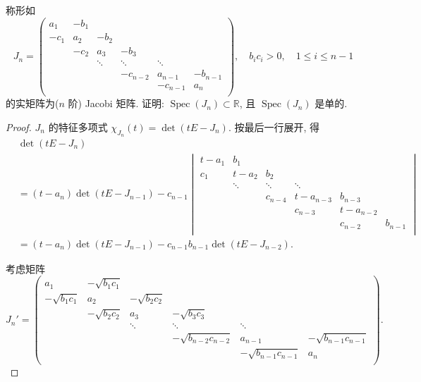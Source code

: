 \documentclass[color=black,device=normal,lang=cn,mode=geye]{elegantnote}
\begin{document}
\begin{exercise}%
    称形如
    \[J_n=\begin{pmatrix}
        a_1 & -b_1 \\
        -c_1 & a_2 & -b_2 \\
        & -c_2 & a_3 & -b_3 \\
        && \ddots & \ddots & \ddots \\
        &&& -c_{n-2} & a_{n-1} & -b_{n-1} \\
        &&&& -c_{n-1} & a_n \\
    \end{pmatrix},\quad b_ic_i>0,\quad1\leq i\leq n-1\]
    的实矩阵为($n$ 阶) Jacobi 矩阵. 证明: $\operatorname{Spec}(J_n)\subset\mathbb{R}$, 且 $\operatorname{Spec}(J_n)$ 是单的.
\end{exercise}
\begin{proof}
    $J_n$ 的特征多项式 $\chi_{J_n}(t)=\det(tE-J_n)$. 按最后一行展开, 得
    \begin{align*}
        & \det(tE-J_n) \\
        & =(t-a_n)\det(tE-J_{n-1})-c_{n-1}\begin{vmatrix}
            t-a_1 & b_1 \\
            c_1 & t-a_2 & b_2 \\
            & \ddots & \ddots & \ddots \\
            && c_{n-4} & t-a_{n-3} & b_{n-3} \\
            &&& c_{n-3} & t-a_{n-2} \\
            &&&& c_{n-2} & b_{n-1} \\
        \end{vmatrix} \\
        & =(t-a_n)\det(tE-J_{n-1})-c_{n-1}b_{n-1}\det(tE-J_{n-2}).
    \end{align*}

    考虑矩阵
    \[J_n'=\begin{pmatrix}
        a_1 & -\sqrt{b_1c_1} \\
        -\sqrt{b_1c_1} & a_2 & -\sqrt{b_2c_2} \\
        & -\sqrt{b_2c_2} & a_3 & -\sqrt{b_3c_3} \\
        && \ddots & \ddots & \ddots \\
        &&& -\sqrt{b_{n-2}c_{n-2}} & a_{n-1} & -\sqrt{b_{n-1}c_{n-1}} \\
        &&&& -\sqrt{b_{n-1}c_{n-1}} & a_n \\
    \end{pmatrix}.\]


\end{proof}
\end{document}
